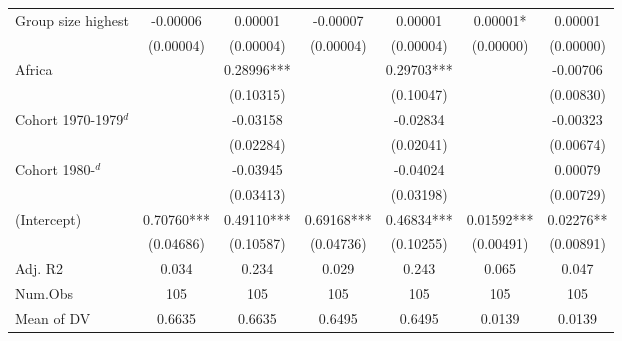 \begin{tabular}[t]{lcccccc}
\hspace{1em}Group size highest & -0.00006 & 0.00001 & -0.00007 & 0.00001 & 0.00001* & 0.00001\\
\hspace{1em} & (0.00004) & (0.00004) & (0.00004) & (0.00004) & (0.00000) & (0.00000)\\
\hspace{1em}Africa &  & 0.28996*** &  & 0.29703*** &  & -0.00706\\
\hspace{1em} &  & (0.10315) &  & (0.10047) &  & (0.00830)\\
\hspace{1em}Cohort 1970-1979$^d$ &  & -0.03158 &  & -0.02834 &  & -0.00323\\
\hspace{1em} &  & (0.02284) &  & (0.02041) &  & (0.00674)\\
\hspace{1em}Cohort 1980-$^d$ &  & -0.03945 &  & -0.04024 &  & 0.00079\\
\hspace{1em} &  & (0.03413) &  & (0.03198) &  & (0.00729)\\
\hspace{1em}(Intercept) & 0.70760*** & 0.49110*** & 0.69168*** & 0.46834*** & 0.01592*** & 0.02276**\\
\hspace{1em} & (0.04686) & (0.10587) & (0.04736) & (0.10255) & (0.00491) & (0.00891)\\
\hspace{1em}Adj. R2 & 0.034 & 0.234 & 0.029 & 0.243 & 0.065 & 0.047\\
\midrule
\hspace{1em}Num.Obs & 105 & 105 & 105 & 105 & 105 & 105\\
\hspace{1em}Mean of DV & 0.6635 & 0.6635 & 0.6495 & 0.6495 & 0.0139 & 0.0139\\
\bottomrule
\end{tabular}
